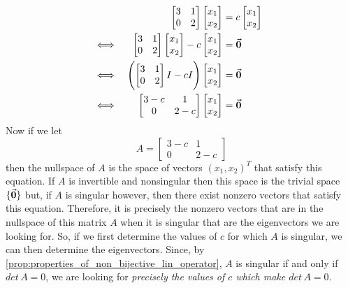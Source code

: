 \documentclass[MathsNotesBase.tex]{subfiles}
\begin{document}
{\begin{exe}
{	 			\begin{align*}
	 			&& \begin{bmatrix}3 & 1\\0 & 2\end{bmatrix}\begin{bmatrix}x_1\\x_2\end{bmatrix} &= c\begin{bmatrix}x_1\\x_2\end{bmatrix}  \\
	 			&\iff & \begin{bmatrix}3 & 1\\0 & 2\end{bmatrix}\begin{bmatrix}x_1\\x_2\end{bmatrix} - c\begin{bmatrix}x_1\\x_2\end{bmatrix} &= \vec{\bm{0}} &\text{\scriptsize{}} \\
	 			&\iff & \left( \begin{bmatrix}3 & 1\\0 & 2\end{bmatrix}I - cI \right)\begin{bmatrix}x_1\\x_2\end{bmatrix} &= \vec{\bm{0}} &\text{\scriptsize{}} \\
	 			&\iff & \begin{bmatrix}3 - c & 1\\0 & 2 - c\end{bmatrix}\begin{bmatrix}x_1\\x_2\end{bmatrix} &= \vec{\bm{0}} &\text{\scriptsize{}} \\
	 			\end{align*}
	 			Now if we let
	 			\[ A = \begin{bmatrix}3 - c & 1\\0 & 2 - c\end{bmatrix} \]
	 			then the nullspace of $A$ is the space of vectors ${ (x_1,x_2)^T }$ that satisfy this equation. If $A$ is invertible and nonsingular then this space is the trivial space ${ \{\vec{\bm{0}}\} }$ but, if $A$ is singular however, then there exist nonzero vectors that satisfy this equation. Therefore, it is precisely the nonzero vectors that are in the nullspace of this matrix $A$ when it is singular that are the eigenvectors we are looking for. So, if we first determine the values of $c$ for which $A$ is singular, we can then determine the eigenvectors. Since, by \autoref{prop:properties_of_non_bijective_lin_operator}, $A$ is singular if and only if ${ det\,A = 0 }$, we are looking for \textit{precisely the values of $c$ which make ${ det\,A = 0 }$}.
	 		}
	 	\end{exe}
 	
}
\end{document}
